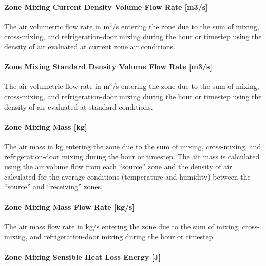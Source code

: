 \paragraph{Zone Mixing Current Density Volume Flow Rate {[}m3/s{]}}\label{zone-mixing-current-density-volumetric-flow-rate-m3s}

The air volumetric flow rate in m\(^{3}\)/s entering the zone due to the sum of mixing, cross-mixing, and refrigeration-door mixing during the hour or timestep using the density of air evaluated at current zone air conditions.

\paragraph{Zone Mixing Standard Density Volume Flow Rate {[}m3/s{]}}\label{zone-mixing-standard-density-volumetric-flow-rate-m3s}

The air volumetric flow rate in m\(^{3}\)/s entering the zone due to the sum of mixing, cross-mixing, and refrigeration-door mixing during the hour or timestep using the density of air evaluated at standard conditions.

\paragraph{Zone Mixing Mass {[}kg{]}}\label{zone-mixing-mass-kg}

The air mass in kg entering the zone due to the sum of mixing, cross-mixing, and refrigeration-door mixing during the hour or timestep. The air mass is calculated using the air volume flow from each ``source'' zone and the density of air calculated for the average conditions (temperature and humidity) between the ``source'' and ``receiving'' zones.

\paragraph{Zone Mixing Mass Flow Rate {[}kg/s{]}}\label{zone-mixing-mass-flow-rate-kgs}

The air mass flow rate in kg/s entering the zone due to the sum of mixing, cross-mixing, and refrigeration-door mixing during the hour or timestep.

\paragraph{Zone Mixing Sensible Heat Loss Energy {[}J{]}}\label{zone-mixing-sensible-heat-loss-energy-j}


